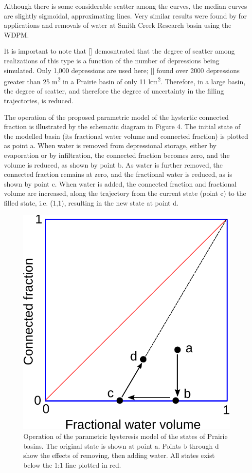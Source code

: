 \documentclass[draft,linenumbers]{agujournal2018}
\begin{document}
Although there is some considerable scatter among the curves, the median
curves are slightly sigmoidal, approximating lines. Very similar results
were found by \citet{shookMemoryEffectsDepressional2011} for
applications and removals of water at Smith Creek Research basin using
the WDPM.

It is important to note that {[}{]} demosntrated that the degree of
scatter among realizations of this type is a function of the number of
depressions being simulated. Only 1,000 depressions are used here;
{[}{]} found over 2000 depressions greater than 25 m\textsuperscript{2}
in a Prairie basin of only 11 km\textsuperscript{2}. Therefore, in a
large basin, the degree of scatter, and therefore the degree of
uncertainty in the filling trajectories, is reduced.

The operation of the proposed parametric model of the hystertic
connected fraction is illustrated by the schematic diagram in Figure 4.
The initial state of the modelled basin (its fractional water volume and
connected fraction) is plotted as point a. When water is removed from
depressional storage, either by evaporation or by infiltration, the
connected fraction becomes zero, and the volume is reduced, as shown by
point b. As water is further removed, the connected fraction remains at
zero, and the fractional water is reduced, as is shown by point c. When
water is added, the connected fraction and fractional volume are
increased, along the trajectory from the current state (point c) to the
filled state, i.e. (1,1), resulting in the new state at point d.

\begin{figure}[h]
\includegraphics[width=1\linewidth,]{figures/hysteresis_model} \caption{Operation of the parametric hysteresis model of the states of Prairie
basins. The original state is shown at point a. Points b through d show the effects of
removing, then adding water. All states exist below the 1:1 line plotted in red.}\label{fig:unnamed-chunk-4}
\end{figure}
\end{document}

